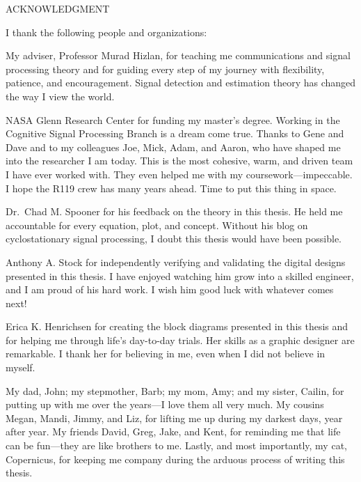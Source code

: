 \newpage
\thispagestyle{empty}

\begin{center}
  ACKNOWLEDGMENT\\
\end{center}

I thank the following people and organizations:

My adviser, Professor Murad Hizlan, for teaching me communications and signal processing theory and for guiding every step of my journey with flexibility, patience, and encouragement.  Signal detection and estimation theory has changed the way I view the world.

NASA Glenn Research Center for funding my master's degree.  Working in the Cognitive Signal Processing Branch is a dream come true.  Thanks to Gene and Dave and to my colleagues Joe, Mick, Adam, and Aaron, who have shaped me into the researcher I am today.  This is the most cohesive, warm, and driven team I have ever worked with.  They even helped me with my coursework---impeccable.  I hope the R119 crew has many years ahead.  Time to put this thing in space.

Dr.\ Chad M. Spooner for his feedback on the theory in this thesis.  He held me accountable for every equation, plot, and concept.  Without his blog on cyclostationary signal processing, I doubt this thesis would have been possible.

Anthony A. Stock for independently verifying and validating the digital designs presented in this thesis.  I have enjoyed watching him grow into a skilled engineer, and I am proud of his hard work.  I wish him good luck with whatever comes next!

Erica K. Henrichsen for creating the block diagrams presented in this thesis and for helping me through life's day-to-day trials.  Her skills as a graphic designer are remarkable.  I thank her for believing in me, even when I did not believe in myself.

My dad, John; my stepmother, Barb; my mom, Amy; and my sister, Cailin, for putting up with me over the years---I love them all very much.  My cousins Megan, Mandi, Jimmy, and Liz, for lifting me up during my darkest days, year after year.  My friends David, Greg, Jake, and Kent, for reminding me that life can be fun---they are like brothers to me.  Lastly, and most importantly, my cat, Copernicus, for keeping me company during the arduous process of writing this thesis.

\thispagestyle{empty}
\vfill
